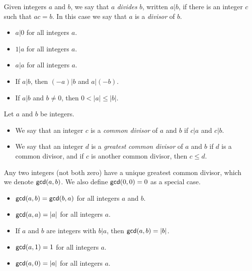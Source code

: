 \begin{dfn}[Divides]
Given integers \(a\) and \(b\), we say that \(a\) \emph{divides} \(b\), written \(a|b\), if there is an integer \(c\) such that \(ac = b\). In this case we say that \(a\) is a \emph{divisor} of \(b\).
\end{dfn}

\begin{prop} \mbox{}
\begin{itemize}
\item \(a|0\) for all integers \(a\).
\item \(1|a\) for all integers \(a\).
\item \(a|a\) for all integers \(a\).
\item If \(a|b\), then \((-a)|b\) and \(a|(-b)\).
\item If \(a|b\) and \(b \neq 0\), then \(0 < |a| \leq |b|\).
\end{itemize}
\end{prop}

\begin{dfn}
Let \(a\) and \(b\) be integers.
\begin{itemize}
\item We say that an integer \(c\) is a \emph{common divisor} of \(a\) and \(b\) if \(c|a\) and \(c|b\).
\item We say that an integer \(d\) is a \emph{greatest common divisor} of \(a\) and \(b\) if \(d\) is a common divisor, and if \(c\) is another common divisor, then \(c \leq d\).
\end{itemize}
\end{dfn}

\begin{prop}
Any two integers (not both zero) have a unique greatest common divisor, which we denote \(\mathsf{gcd}(a, b)\). We also define \(\mathsf{gcd}(0, 0) = 0\) as a special case.
\end{prop}

\begin{prop} \mbox{}
\begin{itemize}
\item \(\mathsf{gcd}(a, b) = \mathsf{gcd}(b, a)\) for all integers \(a\) and \(b\).
\item \(\mathsf{gcd}(a, a) = |a|\) for all integers \(a\).
\item If \(a\) and \(b\) are integers with \(b|a\), then \(\mathsf{gcd}(a, b) = |b|\).
\item \(\mathsf{gcd}(a, 1) = 1\) for all integers \(a\).
\item \(\mathsf{gcd}(a, 0) = |a|\) for all integers \(a\).
\end{itemize}
\end{prop}

